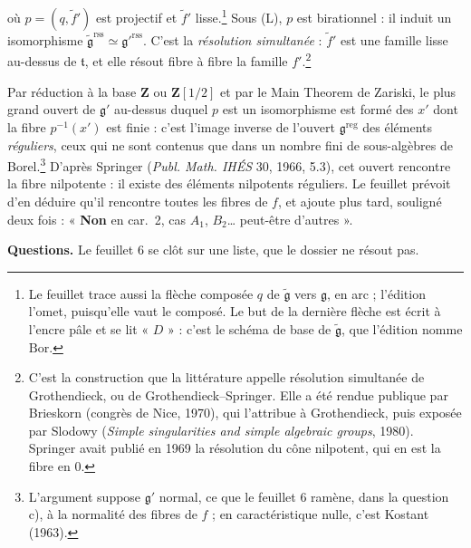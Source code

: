 \documentclass[11pt,a4paper]{article}
\begin{document}
où $p=(q,\tilde f')$ est projectif et $\tilde f'$ lisse.\footnote{Le feuillet
trace aussi la flèche composée $q$ de $\widetilde{\mathfrak{g}}$ vers
$\mathfrak{g}$, en arc ; l'édition l'omet, puisqu'elle vaut le composé. Le but
de la dernière flèche est écrit à l'encre pâle et se lit « $D$ » : c'est le
schéma de base de $\widetilde{\mathfrak{g}}$, que l'édition nomme
$\mathrm{Bor}$.} Sous (L), $p$ est birationnel : il induit un isomorphisme
$\widetilde{\mathfrak{g}}^{\mathrm{rss}}\simeq\mathfrak{g}'^{\mathrm{rss}}$.
C'est la \emph{résolution simultanée} : $\tilde f'$ est une famille lisse au-dessus
de $\mathfrak{t}$, et elle résout fibre à fibre la famille $f'$.\footnote{C'est
la construction que la littérature appelle résolution simultanée de
Grothendieck, ou de Grothendieck--Springer. Elle a été rendue publique par
Brieskorn (congrès de Nice, 1970), qui l'attribue à Grothendieck, puis exposée
par Slodowy (\emph{Simple singularities and simple algebraic groups}, 1980).
Springer avait publié en 1969 la résolution du cône nilpotent, qui en est la
fibre en $0$.}

Par réduction à la base $\mathbf{Z}$ ou $\mathbf{Z}[1/2]$ et par le Main
Theorem de Zariski, le plus grand ouvert de $\mathfrak{g}'$ au-dessus duquel
$p$ est un isomorphisme est formé des $x'$ dont la fibre $p^{-1}(x')$ est finie :
c'est l'image inverse de l'ouvert $\mathfrak{g}^{\mathrm{reg}}$ des éléments
\emph{réguliers}, ceux qui ne sont contenus que dans un nombre fini de
sous-algèbres de Borel.\footnote{L'argument suppose $\mathfrak{g}'$ normal, ce
que le feuillet 6 ramène, dans la question c), à la normalité des fibres de
$f$ ; en caractéristique nulle, c'est Kostant (1963).} D'après Springer
(\emph{Publ. Math. IHÉS} 30, 1966, 5.3), cet ouvert rencontre la fibre
nilpotente : il existe des éléments nilpotents réguliers. Le feuillet prévoit
d'en déduire qu'il rencontre toutes les fibres de $f$, et ajoute plus tard,
souligné deux fois : « \textbf{Non} en car.\ 2, cas $A_{1}$, $B_{2}$… peut-être
d'autres ».

\textbf{Questions.} Le feuillet 6 se clôt sur une liste, que le dossier ne
résout pas.
\end{document}
